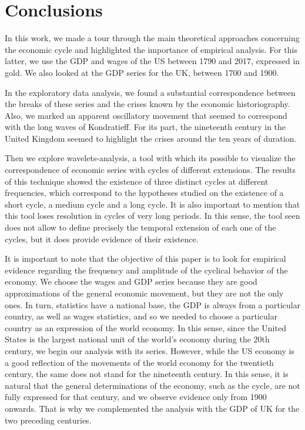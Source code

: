 \documentclass[a4paper]{article}
\begin{document}
	\section{Conclusions}
	
	In this work, we made a tour through the main theoretical approaches concerning the economic cycle and highlighted the importance of empirical analysis. For this latter, we use the GDP and wages of the US between 1790 and 2017, expressed in gold. We also looked at the GDP series for the UK, between 1700 and 1900.
	
	In the exploratory data analysis, we found a substantial correspondence between the breaks of these series and the crises known by the economic historiography. Also, we marked an apparent oscillatory movement that seemed to correspond with the long waves of Kondratieff. For its part, the nineteenth century in the United Kingdom seemed to highlight the crises around the ten years of duration.
	
	Then we explore wavelets-analysis, a tool with which its possible to visualize the correspondence of economic series with cycles of different extensions. The results of this technique showed the existence of three distinct cycles at different frequencies, which correspond to the hypotheses studied on the existence of a short cycle, a medium cycle and a long cycle. It is also important to mention that this tool loses resolution in cycles of very long periods. In this sense, the tool seen does not allow to define precisely the temporal extension of each one of the cycles, but it does provide evidence of their existence.
	
	It is important to note that the objective of this paper is to look for empirical evidence regarding the frequency and amplitude of the cyclical behavior of the economy. We choose the wages and GDP series because they are good approximations of the general economic movement, but they are not the only ones. In turn, statistics have a national base, the GDP is always from a particular country, as well as wages statistics, and so we needed to choose a particular country as an expression of the world economy. In this sense, since the United States is the largest national unit of the world's economy during the 20th century, we begin our analysis with its series. However, while the US economy is a good reflection of the movements of the world economy for the twentieth century, the same does not stand for the nineteenth century. In this sense, it is natural that the general determinations of the economy, such as the cycle, are not fully expressed for that century, and we observe evidence only from 1900 onwards. That is why we complemented the analysis with the GDP of UK for the two preceding centuries.
	
\end{document}
